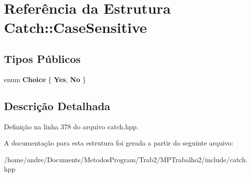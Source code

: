 \hypertarget{structCatch_1_1CaseSensitive}{}\section{Referência da Estrutura Catch\+:\+:Case\+Sensitive}
\label{structCatch_1_1CaseSensitive}
\subsection*{Tipos Públicos}
\begin{DoxyCompactItemize}
\item 
enum {\bfseries Choice} \{ {\bfseries Yes}, 
{\bfseries No}
 \}\hypertarget{structCatch_1_1CaseSensitive_aad49d3aee2d97066642fffa919685c6a}{}\label{structCatch_1_1CaseSensitive_aad49d3aee2d97066642fffa919685c6a}

\end{DoxyCompactItemize}


\subsection{Descrição Detalhada}


Definição na linha 378 do arquivo catch.\+hpp.



A documentação para esta estrutura foi gerada a partir do seguinte arquivo\+:\begin{DoxyCompactItemize}
\item 
/home/andre/\+Documents/\+Metodos\+Program/\+Trab2/\+M\+P\+Trabalho2/include/catch.\+hpp\end{DoxyCompactItemize}

